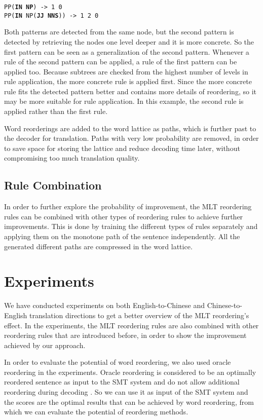 \documentclass[a4paper]{article}
\begin{document}
\noindent \texttt{PP(\textbf{IN} \textbf{NP}) -> 1 0}\\
\texttt{PP(\textbf{IN} NP(\textbf{JJ} \textbf{NNS})) -> 1 2 0}\bigskip

Both patterns are detected from the same node, but the second pattern is detected by retrieving the nodes one level deeper and it is more concrete. So the first pattern can be seen as a generalization of the second pattern. Whenever a rule of the second pattern can be applied, a rule of the first pattern can be applied too. Because subtrees are checked from the highest number of levels in rule application, the more concrete rule is applied first. Since the more concrete rule fits the detected pattern better and contains more details of reordering, so it may be more suitable for rule application. In this example, the second rule is applied rather than the first rule.

Word reorderings are added to the word lattice as paths, which is further past to the decoder for translation. Paths with very low probability are removed, in order to save space for storing the lattice and reduce decoding time later, without compromising too much translation quality. 

\subsection{Rule Combination}

In order to further explore the probability of improvement, the MLT reordering rules can be combined with other types of reordering rules to achieve further improvements. This is done by training the different types of rules separately and applying them on the monotone path of the sentence independently. All the generated different paths are compressed in the word lattice.

\section{Experiments}
\label{ex}

We have conducted experiments on both English-to-Chinese and Chinese-to-English translation directions to get a better overview of the MLT reordering's effect. In the experiments, the MLT reordering rules are also combined with other reordering rules that are introduced before, in order to show the improvement achieved by our approach.

In order to evaluate the potential of word reordering, we also used oracle reordering in the experiments. Oracle reordering is considered to be an optimally reordered sentence as input to the SMT system and do not allow additional reordering during decoding \cite{combine}. So we can use it as input of the SMT system and the scores are the optimal results that can be achieved by word reordering, from which we can evaluate the potential of reordering methods.
\end{document}
